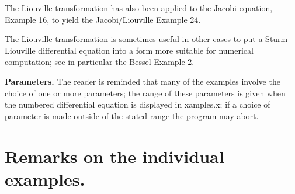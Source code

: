 \documentclass[12pt]{amsart}%
\theoremstyle{plain}
\numberwithin{equation}{section}
\begin{document}
The Liouville transformation has also been applied to the Jacobi equation,
Example 16, to yield the Jacobi/Liouville Example 24.

The Liouville transformation is sometimes useful in other cases to put a
Sturm-Liouville differential equation into a form more suitable for numerical
computation; see in particular the Bessel Example 2.

\textbf{Parameters.} The reader is reminded that many of the examples involve
the choice of one or more parameters; the range of these parameters is given
when the numbered differential equation is displayed in xamples.x; if a choice
of parameter is made outside of the stated range the program may abort.

\section{Remarks on the individual examples.}
\end{document}
